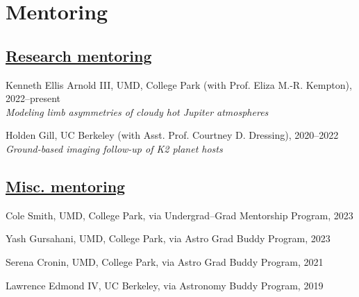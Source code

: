 \documentclass[letterpaper,11.5pt]{article}
\newcommand{\resumeItemNoBullet}[2]{
  \item[]\small{
    \hspace{-9pt}\textbf{#1}{: #2 \vspace{-6pt}}
  }
}
\newcommand{\resumeSubHeadingListStart}{\begin{itemize}[leftmargin=*]}
\newcommand{\resumeSubHeadingListEnd}{\end{itemize}}
\newcommand{\resumeItemListStart}{\begin{itemize}}
\newcommand{\shorterSection}[1]{\vspace{-10pt}\section{#1}}
\newcommand{\shortershorterSection}[1]{\vspace{-10pt}\subsection{#1}}
\begin{document}
\shorterSection{Mentoring}
\vspace{15pt}
\shortershorterSection{\underline{Research mentoring}}
\small
  \begin{list}{}{\cvlist}  
  \item[{\color{numcolor}}]Kenneth Ellis Arnold III, UMD, College Park (with Prof. Eliza M.-R. Kempton), 2022--present \\
  \textit{Modeling limb asymmetries of cloudy hot Jupiter atmospheres}
  \item[{\color{numcolor}}]Holden Gill, UC Berkeley (with Asst. Prof. Courtney D. Dressing), 2020--2022 \\
    \textit{Ground-based imaging follow-up of K2 planet hosts}


  \end{list}
\shortershorterSection{\underline{Misc. mentoring}}
\small
  \begin{list}{}{\cvlist}
  \item[{\color{numcolor}}]Cole Smith, UMD, College Park, via Undergrad--Grad Mentorship Program, 2023
  \item[{\color{numcolor}}]Yash Gursahani, UMD, College Park, via Astro Grad Buddy Program, 2023
  \item[{\color{numcolor}}]Serena Cronin, UMD, College Park, via Astro Grad Buddy Program, 2021 
  \item[{\color{numcolor}}]Lawrence Edmond IV, UC Berkeley, via Astronomy Buddy Program, 2019


  \end{list} 





\end{document}
